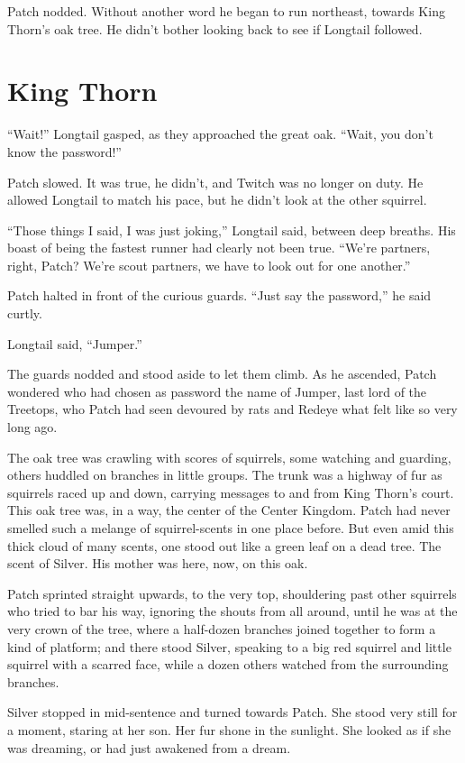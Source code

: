\documentclass[ebook,oneside,openany,17pt]{memoir}
\renewcommand{\thechapter}{\Roman{chapter}}
\newcounter{sections}
\newcommand{\sections}[1]{%
  \section*{#1}
  \addtocounter{sections}{1}%
  \pdfbookmark[1]{#1}{section.\thechapter.\thesections}}
\begin{document}
Patch nodded. Without another word he began to run northeast, towards
King Thorn’s oak tree. He didn’t bother looking back to see if
Longtail followed.


\sections{King Thorn}

“Wait!” Longtail gasped, as they approached the great oak. “Wait, you
don’t know the password!”

Patch slowed. It was true, he didn’t, and Twitch was no longer on
duty. He allowed Longtail to match his pace, but he didn’t look at the
other squirrel.

“Those things I said, I was just joking,” Longtail said, between deep
breaths. His boast of being the fastest runner had clearly not been
true. “We’re partners, right, Patch? We’re scout partners, we have to
look out for one another.”

Patch halted in front of the curious guards. “Just say the password,”
he said curtly.

Longtail said, “Jumper.”

The guards nodded and stood aside to let them climb. As he ascended,
Patch wondered who had chosen as password the name of Jumper, last
lord of the Treetops, who Patch had seen devoured by rats and Redeye
what felt like so very long ago.

The oak tree was crawling with scores of squirrels, some watching and
guarding, others huddled on branches in little groups. The trunk was a
highway of fur as squirrels raced up and down, carrying messages to
and from King Thorn’s court. This oak tree was, in a way, the center
of the Center Kingdom. Patch had never smelled such a melange of
squirrel-scents in one place before. But even amid this thick cloud of
many scents, one stood out like a green leaf on a dead tree. The scent
of Silver. His mother was here, now, on this oak.

Patch sprinted straight upwards, to the very top, shouldering past
other squirrels who tried to bar his way, ignoring the shouts from all
around, until he was at the very crown of the tree, where a half-dozen
branches joined together to form a kind of platform; and there stood
Silver, speaking to a big red squirrel and little squirrel with a
scarred face, while a dozen others watched from the surrounding
branches.

Silver stopped in mid-sentence and turned towards Patch. She stood
very still for a moment, staring at her son. Her fur shone in the
sunlight. She looked as if she was dreaming, or had just awakened from
a dream.
\end{document}
